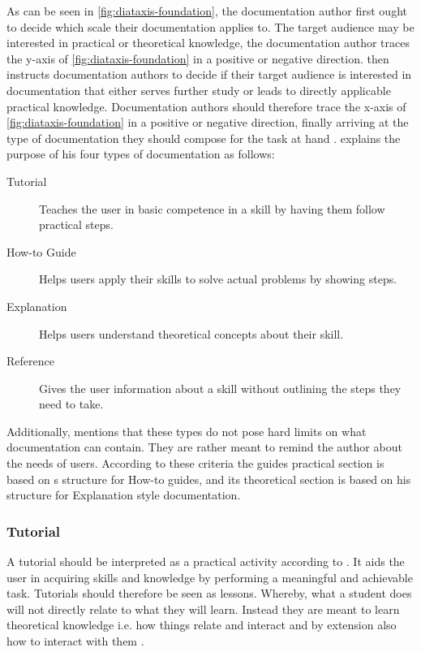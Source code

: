 \noindent
As can be seen in \cref{fig:diataxis-foundation}, the documentation author first ought to decide which scale their documentation applies to.
The target audience may be interested in practical or theoretical knowledge, the documentation author traces the y-axis of \cref{fig:diataxis-foundation} in a positive or negative direction.
\citeauthor{procidaDiataxisDocumentationFramework2023} then instructs documentation authors to decide if their target audience is interested in documentation that either serves further study or leads to directly applicable practical knowledge.
Documentation authors should therefore trace the x-axis of \cref{fig:diataxis-foundation} in a positive or negative direction, finally arriving at the type of documentation they should compose for the task at hand \cite{procidaPythonDocsCommunity2022}.
\citeauthor{procidaDiataxisDocumentationFramework2023} explains the purpose of his four types of documentation as follows:
\begin{description}
	\item[Tutorial] Teaches the user in basic competence in a skill by having them follow practical steps.
	\item[How-to Guide] Helps users apply their skills to solve actual problems by showing steps.
	\item[Explanation] Helps users understand theoretical concepts about their skill.
	\item[Reference] Gives the user information about a skill without outlining the steps they need to take.
\end{description}
Additionally, \citeauthor{procidaDiataxisDocumentationFramework2023} mentions that these types do not pose hard limits on what documentation can contain. They are rather meant to remind the author about the needs of users.
According to these criteria the guides practical section is based on \citeauthor{procidaDiataxisDocumentationFramework2023}s structure for How-to guides, and its theoretical section is based on his structure for Explanation style documentation.

\subsubsection*{Tutorial}
A tutorial should be interpreted as a practical activity according to \citeauthor{procidaDiataxisDocumentationFramework2023}.
It aids the user in acquiring skills and knowledge by performing a meaningful and achievable task.
Tutorials should therefore be seen as lessons.
Whereby, what a student does will not directly relate to what they will learn.
Instead they are meant to learn theoretical knowledge i.e. how things relate and interact and by extension also how to interact with them \cite{procidaPythonDocsCommunity2022,procidaDiataxisDocumentationFramework2023}.

